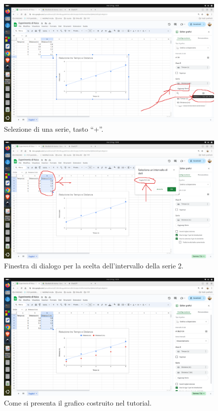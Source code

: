 \documentclass[12pt,a4paper,oneside]{book}
\theoremstyle{esercizio}
\begin{document}
\begin{enumerate}
      \begin{figure}[h!]
    \centering
    \includegraphics[width=\linewidth]{path_to_image/intervallo2.png} 
    \caption{Selezione di una serie, tasto ``+''.}
    \label{fig:intervallo2}
 \end{figure} 
    
    
\begin{figure}[h!]
    \centering
    \includegraphics[width=\linewidth]{path_to_image/intervallo2-dialogo.png} 
    \caption{Finestra di dialogo per la scelta dell'intervallo della serie 2.}
    \label{fig:intervallo2-dialogo}
 \end{figure} 

\begin{figure}[h!]
    \centering
    \includegraphics[width=\linewidth]{path_to_image/finale.png} 
    \caption{Come si presenta il grafico costruito nel tutorial.}
    \label{fig:finale}
 \end{figure} 
\end{enumerate}
\end{document}
